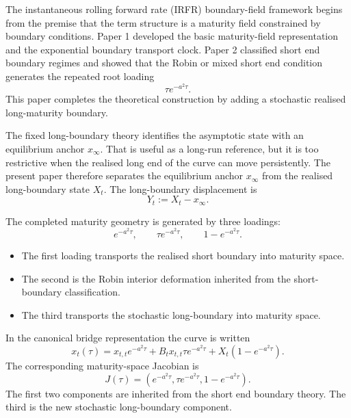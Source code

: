 \documentclass[11pt]{article}
\numberwithin{equation}{section}
\begin{document}
The instantaneous rolling forward rate (IRFR) boundary-field framework begins from the premise that the term structure is a maturity field constrained by boundary conditions. Paper 1 developed the basic maturity-field representation and the exponential boundary transport clock. Paper 2 classified short end boundary regimes and showed that the Robin or mixed short end condition generates the repeated root loading
\[
 \tau e^{-a^2\tau}.
\]
This paper completes the theoretical construction by adding a stochastic realised long-maturity boundary.

The fixed long-boundary theory identifies the asymptotic state with an equilibrium anchor \(x_\infty\). That is useful as a long-run reference, but it is too restrictive when the realised long end of the curve can move persistently. The present paper therefore separates the equilibrium anchor \(x_\infty\) from the realised long-boundary state \(X_t\). The long-boundary displacement is
\begin{equation}
\label{eq:Y-definition}
Y_t:=X_t-x_\infty.
\end{equation}

The completed maturity geometry is generated by three loadings:
\begin{equation}
\label{eq:three-loadings}
e^{-a^2\tau},
\qquad
\tau e^{-a^2\tau},
\qquad
1-e^{-a^2\tau}.
\end{equation}
\begin{itemize}
    \item The first loading transports the realised short boundary into maturity space. 
    \item The second is the Robin interior deformation inherited from the short-boundary classification. 
    \item The third transports the stochastic long-boundary into maturity space.
\end{itemize}

In the canonical bridge representation the curve is written
\begin{equation}
\label{eq:canonical-bridge-intro}
x_t(\tau)
=
x_{t,t}e^{-a^2\tau}
+
B_tx_{t,t}\tau e^{-a^2\tau}
+
X_t\left(1-e^{-a^2\tau}\right).
\end{equation}
The corresponding maturity-space Jacobian is
\begin{equation}
\label{eq:intro-jacobian}
J(\tau)
=
\left(
 e^{-a^2\tau},
 \tau e^{-a^2\tau},
 1-e^{-a^2\tau}
\right).
\end{equation}
The first two components are inherited from the short end boundary theory. The third is the new stochastic long-boundary component.
\end{document}
